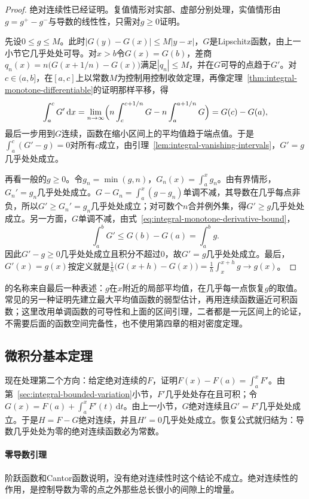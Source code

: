\begin{proof}
绝对连续性已经证明。复值情形对实部、虚部分别处理，实值情形由$g=g^+-g^-$与导数的线性性，只需对$g\ge0$证明。

先设$0\le g\le M$。此时$|G(y)-G(x)|\le M|y-x|$，$G$是Lipschitz函数，由上一小节它几乎处处可导。对$x>b$令$G(x)=G(b)$，差商$q_n(x)=n\bigl(G(x+1/n)-G(x)\bigr)$满足$|q_n|\le M$，并在$G$可导的点趋于$G'$。对$c\in(a,b]$，在$[a,c]$上以常数$M$为控制用控制收敛定理，再像定理~\ref{thm:integral-monotone-differentiable}的证明那样平移，得
\[
 \int_a^cG'\,\mathrm dx=\lim_{n\to\infty}\Bigl(n\int_c^{c+1/n}G-n\int_a^{a+1/n}G\Bigr)=G(c)-G(a),
\]
最后一步用到$G$连续，函数在缩小区间上的平均值趋于端点值。于是$\int_a^c(G'-g)=0$对所有$c$成立，由引理~\ref{lem:integral-vanishing-intervals}，$G'=g$几乎处处成立。

再看一般的$g\ge0$。令$g_n=\min(g,n)$，$G_n(x)=\int_a^xg_n$。由有界情形，$G_n'=g_n$几乎处处成立。$G-G_n=\int_a^x(g-g_n)$单调不减，其导数在几乎每点非负，所以$G'\ge G_n'=g_n$几乎处处成立；对可数个$n$合并例外集，得$G'\ge g$几乎处处成立。另一方面，$G$单调不减，由式~\eqref{eq:integral-monotone-derivative-bound}，
\[
 \int_a^bG'\le G(b)-G(a)=\int_a^bg.
\]
因此$G'-g\ge0$几乎处处成立且积分不超过$0$，故$G'=g$几乎处处成立。最后，$G'(x)=g(x)$按定义就是$\frac1h\bigl(G(x+h)-G(x)\bigr)=\frac1h\int_x^{x+h}g\to g(x)$。
\end{proof}

的名称来自最后一种表述：$g$在$x$附近的局部平均值，在几乎每一点恢复$g$的取值。常见的另一种证明先建立最大平均值函数的弱型估计，再用连续函数逼近可积函数；这里改用单调函数的可导性和上面的区间引理，二者都是一元区间上的论证，不需要后面的函数空间完备性，也不使用第四章的相对密度定理。

\subsection{微积分基本定理}
\label{sec:integral-ftc}

现在处理第二个方向：给定绝对连续的$F$，证明$F(x)-F(a)=\int_a^xF'$。由第~\ref{sec:integral-bounded-variation}小节，$F'$几乎处处存在且可积；令$G(x)=F(a)+\int_a^xF'(t)\,\mathrm dt$。由上一小节，$G$绝对连续且$G'=F'$几乎处处成立。于是$H=F-G$绝对连续，并且$H'=0$几乎处处成立。恢复公式就归结为：导数几乎处处为零的绝对连续函数必为常数。

\paragraph{零导数引理}
阶跃函数和Cantor函数说明，没有绝对连续性时这个结论不成立。绝对连续性的作用，是控制导数为零的点之外那些总长很小的间隙上的增量。


